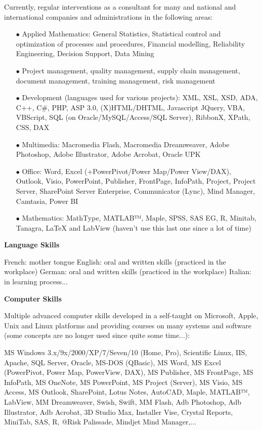 Currently, regular interventions as a consultant for many and national and international companies and administrations in the following areas:
\begin{itemize}	 
	\item[$\bullet$] Applied Mathematics: General Statistics, Statistical control and optimization of processes and procedures, Financial modelling, Reliability Engineering, Decision Support, Data Mining

	\item[$\bullet$] Project management, quality management, supply chain management, document management, training management, risk management

	\item[$\bullet$] Development (languages used for various projects): XML, XSL, XSD, ADA, C++, C\#, PHP, ASP 3.0, (X)HTML/DHTML, Javascript JQuery, VBA, VBScript, SQL (on Oracle/MySQL/Access/SQL Server), RibbonX, XPath, CSS, DAX

	\item[$\bullet$] Multimedia: Macromedia Flash, Macromedia Dreamweaver, Adobe Photoshop, Adobe Illustrator, Adobe Acrobat, Oracle UPK

	\item[$\bullet$] Office: Word, Excel (+PowerPivot/Power Map/Power View/DAX), Outlook, Visio, PowerPoint, Publisher, FrontPage, InfoPath, Project, Project Server, SharePoint Server Enterprise, Communicator (Lync), Mind Manager, Camtasia, Power BI

	\item[$\bullet$] Mathematics: MathType, MATLAB™, Maple, SPSS, SAS EG, R, Minitab, Tanagra, LaTeX and LabView (haven't use this last one since a lot of time)
\end{itemize}

\textbf{Language Skills}

French: mother tongue
English: oral and written skills (practiced in the workplace)
German: oral and written skills (practiced in the workplace)
Italian: in learning process...

\textbf{Computer Skills}

Multiple advanced computer skills developed in a self-taught on Microsoft, Apple, Unix and Linux platforms and providing courses on many systems and software (some concepts are no longer used since quite some time...):

MS Windows 3.x/9x/2000/XP/7/Seven/10 (Home, Pro), Scientific Linux, IIS, Apache, SQL Server, Oracle, MS-DOS (QBasic), MS Word, MS Excel (PowerPivot, Power Map, PowerView, DAX), MS Publisher, MS FrontPage, MS InfoPath, MS OneNote, MS PowerPoint, MS Project (Server), MS Visio, MS Access, MS Outlook, SharePoint, Lotus Notes, AutoCAD, Maple, MATLAB™, LabView, MM Dreamweaver, Swish, Swift, MM Flash, Adb Photoshop, Adb Illustrator, Adb Acrobat, 3D Studio Max, Installer Vise, Crystal Reports, MiniTab, SAS, R, @Risk Palissade, Mindjet Mind Manager,...


